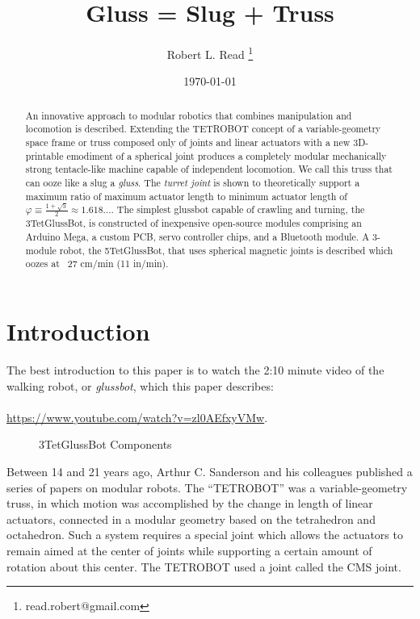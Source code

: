 \documentclass[11pt]{article}
\title{Gluss = Slug + Truss}
\author{Robert L. Read
  \thanks{read.robert@gmail.com}
}
\affil{Founder, Public Invention, an educational non-profit.}
\date{\today}
\begin{document}
\maketitle


\begin{abstract}
  An innovative approach to modular robotics that combines manipulation and locomotion is described.
  Extending the TETROBOT\cite{sanderson1996modular,lee2002dynamic,lee1999dynamics} concept of a variable-geometry
  space frame or truss composed only of joints and linear actuators with a new 3D-printable emodiment of a
  spherical joint\cite{song2003spherical}
  produces a completely modular mechanically strong tentacle-like machine capable of independent locomotion.
  We call this truss that can ooze like a slug a \emph{gluss}.
  The \emph{turret joint} is shown to theoretically support a maximum ratio of maximum actuator length to
  minimum actuator length of  $\varphi \equiv \frac{1 + \sqrt{5}}{2} \approx 1.618...$.
  The simplest glussbot capable of crawling and turning, the 3TetGlussBot, is constructed of
  inexpensive open-source modules comprising an Arduino Mega, a custom PCB, servo controller chips, and a Bluetooth module.
  A 3-module robot, the 5TetGlussBot, that uses spherical magnetic joints is described which oozes at ~27 cm/min (11 in/min).
\end{abstract}

\section{Introduction}

The best introduction to this paper is to watch the 2:10 minute video of the
walking robot, or \emph{glussbot}, which this paper describes:\\
\\
\indent \href{https://www.youtube.com/watch?v=zl0AEfxyVMw}{https://www.youtube.com/watch?v=zl0AEfxyVMw}.\\

\begin{figure}[!ht]
  \centering
    \caption[3TetGlussBot Components]{3TetGlussBot Components}
      \label{annotated}
\end{figure}


Between 14 and 21 years ago, Arthur C. Sanderson and his colleagues published a series of
papers\cite{sanderson1996modular,lee2002dynamic,lee1999dynamics} on modular robots.
The ``TETROBOT'' was a variable-geometry truss, in which motion was accomplished by the change
in length of linear actuators, connected in a modular geometry based on the tetrahedron and octahedron.  Such a system
requires a special joint which allows the actuators to remain aimed at the center of joints while supporting
a certain amount of rotation about this center.  The TETROBOT used a joint called the CMS joint.
\end{document}
